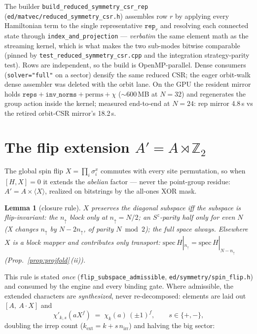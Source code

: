 \documentclass[11pt]{article}
\newtheorem{lem}[prop]{Lemma}
\newcommand{\Z}{\mathbb{Z}}
\newcommand{\file}[1]{\texttt{\small #1}}
\begin{document}
The builder \texttt{build\_reduced\_symmetry\_csr\_rep}
(\file{ed/matvec/reduced\_symmetry\_csr.h}) assembles row $r$ by applying
every Hamiltonian term to the single representative
$\texttt{rep}_r$ and resolving each connected state through
\texttt{index\_and\_projection} --- \emph{verbatim} the same element math
as the streaming kernel, which is what makes the two sub-modes bitwise
comparable (pinned by \file{test\_reduced\_symmetry\_csr.cpp} and the
integration strategy-parity test). Rows are independent, so the build is
OpenMP-parallel. Dense consumers (\texttt{solver="full"} on a sector)
densify the same reduced CSR; the eager orbit-walk dense assembler was
deleted with the orbit lane. On the GPU the resident mirror holds
$\texttt{reps} + \texttt{inv\_norms} + \text{perms} + \chi$
($\sim$600\,MB at $N=32$) and regenerates the group action inside the
kernel; measured end-to-end at $N=24$: rep mirror 4.8\,s vs the retired
orbit-CSR mirror's 18.2\,s.

\section{The flip extension \texorpdfstring{$A' = A \rtimes \Z_2$}{A' = A x Z2}}
\label{sec:flip}

The global spin flip $X = \prod_i \sigma^x_i$ commutes with every site
permutation, so when $[H, X] = 0$ it extends the \emph{abelian} factor ---
never the point-group residue: $A' = A \times \langle X \rangle$, realized
on bitstrings by the all-ones XOR mask.

\begin{lem}[closure rule]\label{lem:flip}
$X$ preserves the diagonal subspace iff the subspace is flip-invariant:
the $n_\uparrow$ block only at $n_\uparrow = N/2$; an $S^z$-parity half only
for even $N$ (X changes $n_\uparrow$ by $N - 2n_\uparrow$, of parity
$N \bmod 2$); the full space always. Elsewhere $X$ is a block mapper and
contributes only \emph{transport}: $\mathrm{spec}\, H|_{n_\uparrow} =
\mathrm{spec}\, H|_{N-n_\uparrow}$ (Prop.~\ref{prop:projfold}\,(ii)).
\end{lem}

This rule is stated \emph{once}
(\texttt{flip\_subspace\_admissible}, \file{ed/symmetry/spin\_flip.h}) and
consumed by the engine and every binding gate. Where admissible, the
extended characters are \emph{synthesized}, never re-decomposed: elements
are laid out $[A,\ A\!\cdot\!X]$ and
\begin{equation}
  \chi'_{k,s}(a X^f) \;=\; \chi_k(a)\, (\pm 1)^f, \qquad s \in \{+,-\},
  \label{eq:chiprime}
\end{equation}
doubling the irrep count ($k_{\mathrm{ext}} = k + s\, n_{\mathrm{irr}}$) and
halving the big sector:
\end{document}
